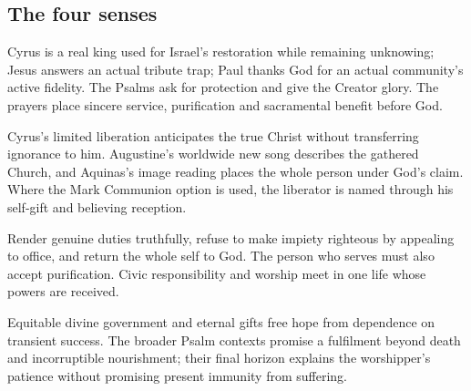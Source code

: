 \subsection{The four senses}
\begin{fourSenses}
\item[Literal.] Cyrus is a real king used for Israel's restoration while remaining unknowing; Jesus answers an actual tribute trap; Paul thanks God for an actual community's active fidelity. The Psalms ask for protection and give the Creator glory. The prayers place sincere service, purification and sacramental benefit before God.
\item[Allegorical.] Cyrus's limited liberation anticipates the true Christ without transferring ignorance to him. Augustine's worldwide new song describes the gathered Church, and Aquinas's image reading places the whole person under God's claim. Where the Mark Communion option is used, the liberator is named through his self-gift and believing reception.
\item[Moral.] Render genuine duties truthfully, refuse to make impiety righteous by appealing to office, and return the whole self to God. The person who serves must also accept purification. Civic responsibility and worship meet in one life whose powers are received.
\item[Anagogical.] Equitable divine government and eternal gifts free hope from dependence on transient success. The broader Psalm contexts promise a fulfilment beyond death and incorruptible nourishment; their final horizon explains the worshipper's patience without promising present immunity from suffering.
\end{fourSenses}
